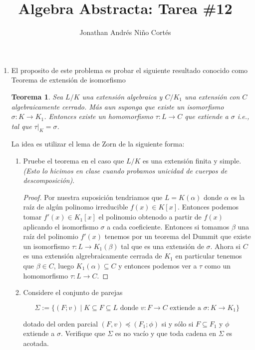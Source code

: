 \documentclass[letter,twoside,12pt]{article}
\title{Algebra Abstracta: Tarea \#12}
\author{Jonathan Andrés Niño Cortés}
\newtheorem{theo}{Teorema}
\begin{document}
\maketitle
\begin{enumerate}
\item El proposito de este problema es probar el siguiente resultado conocido como Teorema de extensión de
isomorfismo

 \begin{theo}
 Sea $ L/ K $ una extensión algebraica y $ C / K_1 $ una extensión con $ C $ algebraicamente cerrado. Más
 aun suponga que existe un isomorfismo $ \sigma : K \to K_1 $. Entonces existe un homomorfismo $ \tau : L \to C  $ que
 extiende a $ \sigma $ i.e., tal que $ \tau|_K = \sigma $.
 \end{theo}

La idea es utilizar el lema de Zorn de la siguiente forma:
\begin{enumerate}
\item Pruebe el teorema en el caso que
$ L / K $
es una extensión finita y simple. \textit{(Esto lo hicimos en clase
cuando probamos unicidad de cuerpos de descomposición)}.

\begin{proof}
Por nuestra suposición tendriamos que $ L = K(\alpha) $ donde $ \alpha $ es la raíz de algún polinomo irreducible $ f(x) \in K[x] $. Entonces podemos tomar $ f'(x) \in K_1[x] $ el polinomio obtenodo a partir de $ f(x) $ aplicando el isomorfismo $ \sigma $ a cada coeficiente. Entonces si tomamos $ \beta $ una raíz del polinomio $ f'(x) $ tenemos por un teorema del Dummit que existe un isomorfismo $ \tau: L \to K_1(\beta) $ tal que es una extensión de $ \sigma $. Ahora si $ C $ es una extensión algrebraicamente cerrada de $ K_1 $ en particular tenemos que $ \beta \in C $, luego $ K_1(\alpha) \subseteq C $ y entonces podemos ver a $ \tau $ como un homomorfismo $ \tau:L \to C $.
\end{proof}

\item Considere el conjunto de parejas

$$ \Sigma := \{(F;v) \;| \; K \subseteq F \subseteq L \text{ donde } v : F \to C \text{ extiende a } \sigma : K \to K_1 \} $$

 dotado del orden parcial $ (F, v) \preceq (F_1; \phi) $ si y sólo si $ F \subseteq F_1 $ y $ \phi $ extiende a $ \sigma $. Verifique que $ \Sigma $ es no
vacío y que toda cadena en $ \Sigma $ es acotada.


\end{enumerate}
\end{enumerate}
\end{document}
